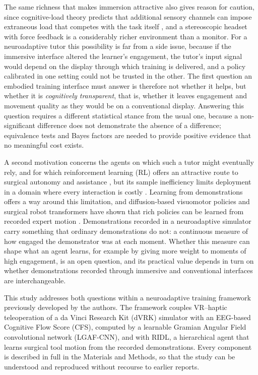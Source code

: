\documentclass[utf8]{frontiers_suppmat}
\begin{document}
The same richness that makes immersion attractive also gives reason for caution, since cognitive-load theory predicts that additional sensory channels can impose extraneous load that competes with the task itself \cite{jining2021lost,Sokolowska2023-cz}, and a stereoscopic headset with force feedback is a considerably richer environment than a monitor. For a neuroadaptive tutor this possibility is far from a side issue, because if the immersive interface altered the learner's engagement, the tutor's input signal would depend on the display through which training is delivered, and a policy calibrated in one setting could not be trusted in the other. The first question an embodied training interface must answer is therefore not whether it helps, but whether it is \emph{cognitively transparent}, that is, whether it leaves engagement and movement quality as they would be on a conventional display. Answering this question requires a different statistical stance from the usual one, because a non-significant difference does not demonstrate the absence of a difference; equivalence tests and Bayes factors are needed to provide positive evidence that no meaningful cost exists.

A second motivation concerns the agents on which such a tutor might eventually rely, and for which reinforcement learning (RL) offers an attractive route to surgical autonomy and assistance \cite{Zhang2021,Brunke2022,Kassahun2016,Andras2020}, but its sample inefficiency limits deployment in a domain where every interaction is costly \cite{Barnoy2021,Xu2021}. Learning from demonstrations offers a way around this limitation, and diffusion-based visuomotor policies and surgical robot transformers have shown that rich policies can be learned from recorded expert motion \cite{chi2023diffusion,kim2024srt}. Demonstrations recorded in a neuroadaptive simulator carry something that ordinary demonstrations do not: a continuous measure of how engaged the demonstrator was at each moment. Whether this measure can shape what an agent learns, for example by giving more weight to moments of high engagement, is an open question, and its practical value depends in turn on whether demonstrations recorded through immersive and conventional interfaces are interchangeable.

This study addresses both questions within a neuroadaptive training framework previously developed by the authors. The framework couples VR--haptic teleoperation of a da Vinci Research Kit (dVRK) simulator with an EEG-based Cognitive Flow Score (CFS), computed by a learnable Gramian Angular Field convolutional network (LGAF-CNN), and with RIDL, a hierarchical agent that learns surgical tool motion from the recorded demonstrations. Every component is described in full in the Materials and Methods, so that the study can be understood and reproduced without recourse to earlier reports.
\end{document}
